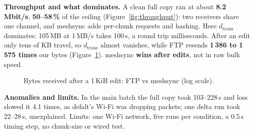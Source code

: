 \textbf{Throughput and what dominates.} A clean full copy ran at about \textbf{8.2\,Mbit/s},
\textbf{50--58\,\%} of the  ceiling (Figure~\ref{fig:throughput}): two receivers share one
channel, and meshsync adds per-chunk requests and hashing. Here $d_\mathrm{trans}$ dominates: 105\,MB at
1\,MB/s takes 100\,s, a round trip milliseconds. After an edit only tens of KB travel, so
$d_\mathrm{trans}$ almost vanishes, while FTP resends \textbf{1\,386 to 1\,575 times} our bytes
(Figure~\ref{fig:ftp-bytes}). meshsync \textbf{wins after edits}, not in raw bulk speed.

\begin{figure}[H]\centering
  \begin{minipage}[t]{0.48\linewidth}\centering
    \caption{Throughput per condition ($\pm$1 sd) against the  ceiling from kratos.}
    \label{fig:throughput}
  \end{minipage}\hfill
  \begin{minipage}[t]{0.48\linewidth}\centering
    \caption{Bytes received after a 1\,KiB edit: FTP vs meshsync (log scale).}
    \label{fig:ftp-bytes}
  \end{minipage}
\end{figure}

\textbf{Anomalies and limits.} In the main batch the full copy took 103--228\,s and loss slowed it
4.1 times, as defalt's Wi-Fi was dropping packets; one delta run took 22--28\,s, unexplained. Limits: one Wi-Fi network, five runs per condition, a 0.5\,s timing
step, no chunk-size or wired test.
